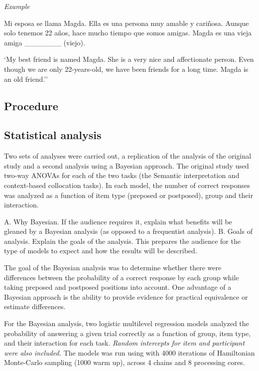 \documentclass[
  man]{apa6}
\begin{document}
\emph{Example}

Mi esposa se llama Magda. Ella es una persona muy amable y cariñosa. Aunque solo tenemos 22 años, hace mucho tiempo que somos amigas. Magda es una vieja amiga \_\_\_\_\_\_\_ (viejo).

`My best friend is named Magda. She is a very nice and affectionate person. Even though we are only 22-years-old, we have been friends for a long time. Magda is an old friend.''

\hypertarget{procedure}{%
\subsection{Procedure}\label{procedure}}

\hypertarget{statistical-analysis}{%
\subsection{Statistical analysis}\label{statistical-analysis}}

Two sets of analyses were carried out, a replication of the analysis of the original study and a second analysis using a Bayesian approach.
The original study used two-way ANOVAs for each of the two tasks (the Semantic interpretation and context-based collocation tasks).
In each model, the number of correct responses was analyzed as a function of item type (preposed or postposed), group and their interaction.

A. Why Bayesian. If the audience requires it, explain what benefits will be gleaned by a Bayesian analysis (as opposed to a frequentist analysis).
B. Goals of analysis. Explain the goals of the analysis. This prepares the audience for the type of models to expect and how the results will be described.

The goal of the Bayesian analysis was to determine whether there were differences between the probability of a correct response by each group while taking preposed and postposed positions into account.
One advantage of a Bayesian approach is the ability to provide evidence for practical equivalence or estimate differences.

For the Bayesian analysis, two logistic multilevel regression models analyzed the probability of answering a given trial correctly as a function of group, item type, and their interaction for each task.
\emph{Random intercepts for item and participant were also included.}
The models was run using with 4000 iterations of Hamiltonian Monte-Carlo sampling (1000 warm up), across 4 chains and 8 processing cores.
\end{document}
